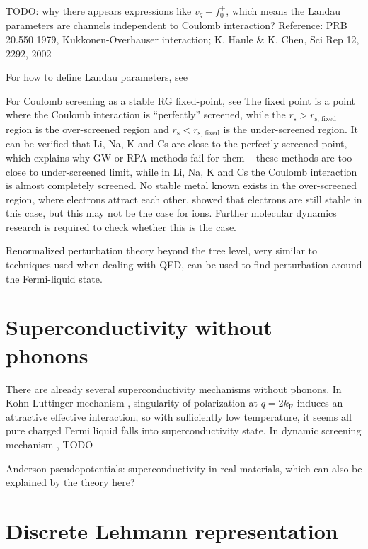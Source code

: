\documentclass[hyperref, a4paper]{article}
\begin{document}
TODO: why there appears expressions like $v_q + f_0^+$, which means the Landau parameters are channels independent to Coulomb interaction?
Reference: PRB 20.550 1979, Kukkonen-Overhauser interaction; K. Haule \& K. Chen, Sci Rep 12, 2292, 2002

For how to define Landau parameters, see \cite{PhysRevLett.75.689}

For Coulomb screening as a stable RG fixed-point, see \cite{PhysRevB.104.195142}
The fixed point is a point where the Coulomb interaction is ``perfectly'' screened, while the $r_\text{s} 
> r_\text{s, fixed}$ region is the over-screened region and $r_\text{s} < r_\text{s, fixed}$ is the under-screened region. 
It can be verified that Li, Na, K and Cs are close to the perfectly screened point, which explains why GW or RPA methods fail for them -- these methods are too close to under-screened limit, while in Li, Na, K and Cs the Coulomb interaction is almost completely screened.
No stable metal known exists in the over-screened region, where electrons attract each other. \cite{RevModPhys.53.81} showed that electrons are still stable in this case, but this may not be the case for ions. Further molecular dynamics research is required to check whether this is the case.

Renormalized perturbation theory beyond the tree level, very similar to techniques used when dealing with QED, can be used to find perturbation around the Fermi-liquid state.

\section{Superconductivity without phonons}

There are already several superconductivity mechanisms without phonons. 
In Kohn-Luttinger mechanism \cite{PhysRevLett.15.524}, singularity of polarization at $q = 2 k_\text{F}$ induces an attractive effective interaction, so with sufficiently low temperature, it seems all pure charged Fermi liquid falls into superconductivity state.
In dynamic screening mechanism \cite{PhysRevB.28.5100}, TODO

Anderson pseudopotentials: superconductivity in real materials, which can also be explained by the theory here?

\section{Discrete Lehmann representation}
\end{document}

